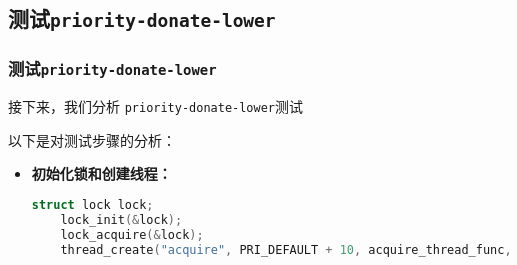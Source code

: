 \documentclass{beamer}
\begin{document}
\subsection{测试\texttt{priority-donate-lower}}
\begin{frame}
  \frametitle{测试\texttt{priority-donate-lower}}
  接下来，我们分析 \texttt{priority-donate-lower}测试


    
    
    
    
    
    

  \framebreak

  以下是对测试步骤的分析：

  \begin{itemize}
    \item \textbf{初始化锁和创建线程：}
          \begin{lstlisting}[language=C]
    struct lock lock;
    lock_init(&lock);
    lock_acquire(&lock);
    thread_create("acquire", PRI_DEFAULT + 10, acquire_thread_func, &lock);
\end{lstlisting}


\end{itemize}
\end{frame}
\end{document}
